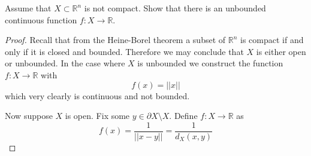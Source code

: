 \newpage  
\begin{prob}
    Assume that $X \subset \mathbb R^n$ is not compact. 
    Show that there is an unbounded continuous function 
    $f: X \to \mathbb R$. 
\end{prob}
\begin{proof}   
    Recall that from the Heine-Borel theorem a 
    subset of $\mathbb R^n$ is compact if and only if 
    it is closed and bounded. Therefore 
    we may conclude that $X$ is either open or 
    unbounded. In the case where $X$ is unbounded 
    we construct the function $f : X \to \mathbb R$ with 
    \[
        f(x) = ||x||
    \]
    which very clearly is continuous and not bounded. 
    
    Now suppose $X$ is open. 
    Fix some $y \in \partial X \setminus X$. 
    Define $f : X \to \mathbb R$ as 
    \[
        f(x) = \frac{1}{||x-y||} = \frac{1}{d_X(x,y)} 
    \]
\end{proof}

\newpage 
